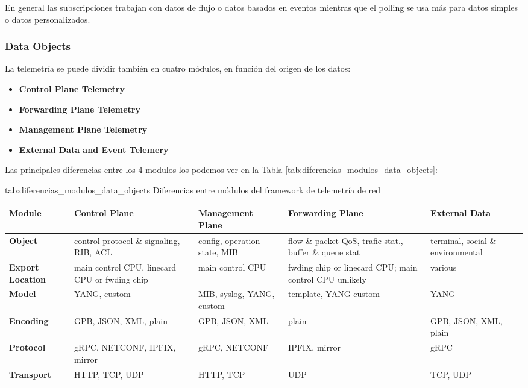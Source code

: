 En general las subscripciones trabajan con datos de flujo o datos basados en eventos mientras que el polling se usa más para datos simples o datos personalizados.


\subsubsection{Data Objects}
La telemetría se puede dividir también en cuatro módulos, en función del origen de los datos:

\begin{itemize}
    \item \textbf{Control Plane Telemetry}
    \item \textbf{Forwarding Plane Telemetry}
    \item \textbf{Management Plane Telemetry}
    \item \textbf{External Data and Event Telemery}
\end{itemize}


Las principales diferencias entre los 4 modulos los podemos ver en la Tabla \ref{tab:diferencias_modulos_data_objects}:
\begin{table}[Comparación entre modulos del framework de telemetría]
             {tab:diferencias_modulos_data_objects}
             {Diferencias entre módulos del framework de telemetría de red}
             
    \begin{tabular}{|p{2cm}|p{3cm}|p{3cm}|p{3cm}|p{2.75cm}|}
        \hline
        \textbf{Module} & \textbf{Control Plane} &\textbf{Management Plane} & \textbf{Forwarding Plane} & \textbf{External Data} \\\hline
        
        \textbf{Object} & control protocol \& signaling, RIB, ACL & config, operation state, MIB & flow \& packet QoS, trafic stat., buffer \& queue stat & terminal, social \& environmental\\\hline
        
        \textbf{Export Location }& main control CPU, linecard CPU or fwding chip & main control CPU & fwding chip or linecard CPU; main control CPU unlikely & various \\\hline
        
        \textbf{Model} & YANG, custom & MIB, syslog, YANG, custom & template, YANG custom & YANG\\\hline
        
        \textbf{Encoding} & GPB, JSON, XML, plain & GPB, JSON, XML & plain &  GPB, JSON, XML, plain\\\hline
        
        \textbf{Protocol} & gRPC, NETCONF, IPFIX, mirror & gRPC, NETCONF& IPFIX, mirror & gRPC\\\hline
        
        \textbf{Transport} & HTTP, TCP, UDP & HTTP, TCP & UDP & TCP, UDP \\\hline
        
    \end{tabular}

\end{table}



